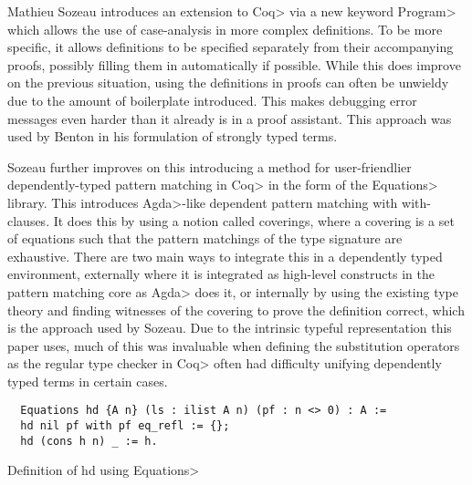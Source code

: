 Mathieu Sozeau introduces an extension to \<Coq> via a new keyword \<Program> which allows the use of case-analysis in more complex definitions\cite{Sozeau2006}\cite{Sozeau2007}.
To be more specific, it allows definitions to be specified separately from their accompanying proofs, possibly filling them in automatically if possible.
While this does improve on the previous situation, using the definitions in proofs can often be unwieldy due to the amount of boilerplate introduced.
This makes debugging error messages even harder than it already is in a proof assistant. This approach was used by Benton in his formulation of strongly typed terms.

Sozeau further improves on this introducing a method for user-friendlier dependently-typed pattern matching in \<Coq> in the form of the \<Equations> library\cite{Sozeau2010}\cite{Sozeau2019}.
This introduces \<Agda>-like dependent pattern matching with with-clauses.
It does this by using a notion called coverings, where a covering is a set of equations such that the pattern matchings of the type signature are exhaustive.
There are two main ways to integrate this in a dependently typed environment, externally where it is integrated as high-level constructs in the pattern matching core as \<Agda> does it, or internally by using the existing type theory and finding witnesses of the covering to prove the definition correct, which is the approach used by Sozeau.
Due to the intrinsic typeful representation this paper uses, much of this was invaluable when defining the substitution operators as the regular type checker in \<Coq> often had difficulty unifying dependently typed terms in certain cases.

\begin{listing}
  \begin{verbatim}
  Equations hd {A n} (ls : ilist A n) (pf : n <> 0) : A :=
  hd nil pf with pf eq_refl := {};
  hd (cons h n) _ := h.
  \end{verbatim}
  \caption{Definition of hd using \<Equations>}
  \label{lst:dt_ilist_hd_equations}
\end{listing}
